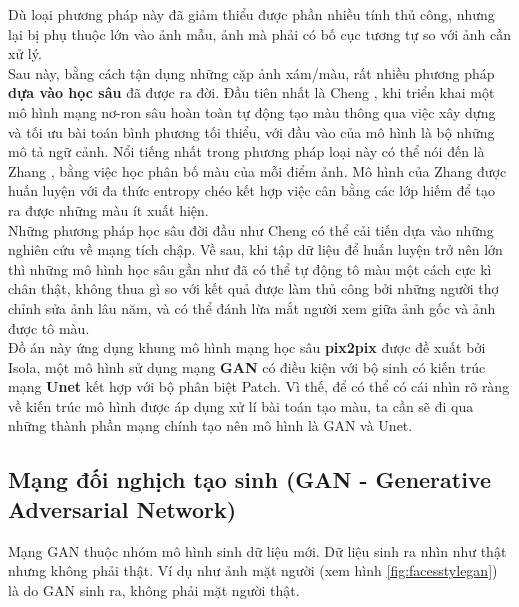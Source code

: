 \documentclass[a4paper, 12pt]{article}
\begin{document}
\noindent
Dù loại phương pháp này đã giảm thiểu được phần nhiều tính thủ công, nhưng lại bị phụ thuộc lớn vào ảnh mẫu, ảnh mà phải có bố cục tương tự so với ảnh cần xử lý.\vspace{5pt}\\
Sau này, bằng cách tận dụng những cặp ảnh xám/màu, rất nhiều phương pháp \textbf{dựa vào học sâu} đã được ra đời. Đầu tiên nhất là Cheng \cite{chengcolorization}, khi triển khai một mô hình mạng nơ-ron sâu hoàn toàn tự động tạo màu thông qua việc xây dựng và tối ưu bài toán bình phương tối thiểu, với đầu vào của mô hình là bộ những mô tả ngữ cảnh. Nổi tiếng nhất trong phương pháp loại này có thể nói đến là Zhang \cite{zhangcolorization}, bằng việc học phân bố màu của mỗi điểm ảnh. Mô hình của Zhang được huấn luyện với đa thức entropy chéo kết hợp việc cân bằng các lớp hiếm để tạo ra được những màu ít xuất hiện.\vspace{5pt}\\
Những phương pháp học sâu đời đầu như Cheng có thể cải tiến dựa vào những nghiên cứu về mạng tích chập. Về sau, khi tập dữ liệu để huấn luyện trở nên lớn thì những mô hình học sâu gần như đã có thể tự động tô màu một cách cực kì chân thật, không thua gì so với kết quả được làm thủ công bởi những người thợ chỉnh sửa ảnh lâu năm, và có thể đánh lừa mắt người xem giữa ảnh gốc và ảnh được tô màu.\vspace{5pt}\\
Đồ án này ứng dụng khung mô hình mạng học sâu \textbf{pix2pix} \cite{isola2018imagetoimage} được đề xuất bởi Isola, một mô hình sử dụng mạng \textbf{GAN} \cite{goodfellow2014generative} có điều kiện với bộ sinh có kiến trúc mạng \textbf{Unet} \cite{ronneberger2015unet} kết hợp với bộ phân biệt Patch. Vì thế, để có thể có cái nhìn rõ ràng về kiến trúc mô hình được áp dụng xử lí bài toán tạo màu, ta cần sẽ đi qua những thành phần mạng chính tạo nên mô hình là GAN và Unet.

\subsection{Mạng đối nghịch tạo sinh (GAN - Generative Adversarial Network)}
Mạng GAN thuộc nhóm mô hình sinh dữ liệu mới. Dữ liệu sinh ra nhìn như thật nhưng không phải thật. Ví dụ như ảnh mặt người (xem hình \ref{fig:facesstylegan}) là do GAN sinh ra, không phải mặt người thật.
\end{document}
